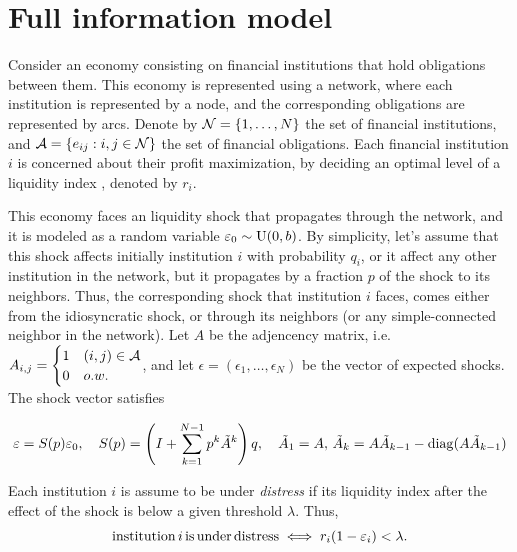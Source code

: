 \section{Full information model}\label{sec:fullinfo}
Consider an economy consisting on financial institutions that hold obligations between them.  This economy is represented using a network, where each institution is represented by a node, and the corresponding obligations are represented by arcs.  Denote by $\cN=\{1,\ldots,N\}$ the set of financial institutions, and $\cA=\{e_{ij}:i,j\in\cN\}$ the set of financial obligations.  Each financial institution $i$ is concerned about their profit maximization,  by deciding an optimal level of a liquidity index , denoted by $r_i$.

This economy faces an liquidity shock that propagates through the network, and it is modeled as a random variable $\epsilon_0\sim{\rm U}(0,b)$.  By simplicity, let's assume that this shock affects initially institution $i$ with probability $q_i$, or it affect any other institution in the network, but it propagates by a fraction $p$ of the shock to its neighbors.  Thus, the corresponding shock that institution $i$ faces, comes either from the idiosyncratic shock, or through its neighbors (or any simple-connected neighbor in the network).  Let $A$ be the adjencency matrix, i.e. $A_{i,j} = \begin{cases} 1 & (i,j)\in\cA\\ 0 &o.w.\end{cases}$, and let $\epsilon=(\epsilon_1,\ldots,\epsilon_N)$ be the vector of expected shocks.  The shock vector satisfies

\begin{equation}\label{eps}
\epsilon = S(p)\epsilon_0,\quad S(p)=\left(I +\sum_{k=1}^{N-1}p^k\tilde{A}^k\right)q,\quad \tilde{A}_1=A,\,\tilde{A}_k = A\tilde{A}_{k-1}-{\rm diag}(A\tilde{A}_{k-1})
\end{equation}

Each institution $i$ is assume to be under \emph{distress} if its liquidity index after the effect of the shock is below a given threshold $\lambda$.  Thus,
\begin{equation}\label{distress}
{\rm institution}\,i\,{\rm is\,under\,distress} \iff r_i(1-\epsilon_i) < \lambda.
\end{equation}

